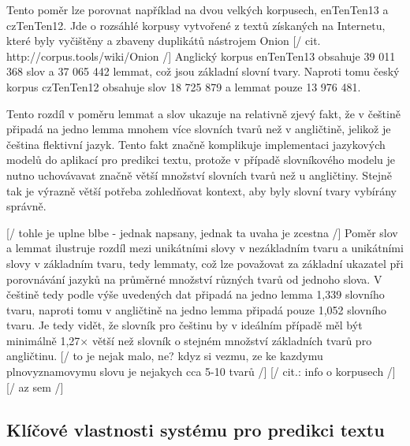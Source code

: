 \documentclass{article}
\begin{document}
Tento poměr lze porovnat například na dvou velkých korpusech, enTenTen13 a czTenTen12. Jde o rozsáhlé korpusy vytvořené z textů získaných na Internetu, které byly vyčištěny a zbaveny duplikátů nástrojem Onion [/ cit. http://corpus.tools/wiki/Onion /] Anglický korpus enTenTen13 obsahuje 39 011 368 slov a 37 065 442 lemmat, což jsou základní slovní tvary. Naproti tomu český korpus czTenTen12 obsahuje slov 18 725 879 a lemmat pouze 13 976 481. 

Tento rozdíl v poměru lemmat a slov ukazuje na relativně zjevý fakt, že v češtině připadá na jedno lemma mnohem více slovních tvarů než v angličtině, jelikož je čeština flektivní jazyk. Tento fakt značně komplikuje implementaci jazykových  modelů do aplikací pro predikci textu, protože v případě slovníkového modelu je nutno uchovávavat značně větší množství slovních tvarů než u angličtiny. Stejně tak je výrazně větší potřeba zohledňovat kontext, aby byly slovní tvary vybírány správně.

[/ tohle je uplne blbe - jednak napsany, jednak ta uvaha je zcestna /]
Poměr slov a lemmat ilustruje rozdíl mezi unikátními slovy v nezákladním tvaru a unikátními slovy v základním tvaru, tedy lemmaty, což lze považovat za základní ukazatel při porovnávání jazyků na průměrné množství různých tvarů od jednoho slova. V češtině tedy podle výše uvedených dat připadá na jedno lemma 1,339 slovního tvaru, naproti tomu v angličtině na jedno lemma připadá pouze 1,052 slovního tvaru. Je tedy vidět, že slovník pro češtinu by v ideálním případě měl být minimálně 1,27× větší než slovník o stejném množství základních tvarů pro angličtinu. [/ to je nejak malo, ne? kdyz si vezmu, ze ke kazdymu plnovyznamovymu slovu je nejakych cca 5-10 tvarů /] [/ cit.: info o korpusech /]
[/ az sem /]

\subsection{Klíčové vlastnosti systému pro predikci textu}
\end{document}
